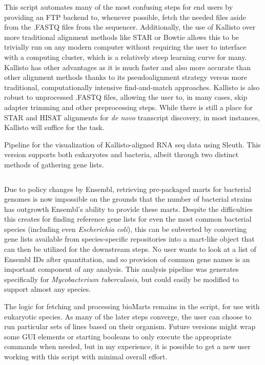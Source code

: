 This script automates many of the most confusing steps for end users by providing an FTP backend to, whenever possible, fetch the needed files aside from the .FASTQ files from the sequencer. Additionally, the use of Kallisto over more traditional alignment methods like STAR or Bowtie allows this to be trivially run on any modern computer without requiring the user to interface with a computing cluster, which is a relatively steep learning curve for many. Kallisto has other advantages as it is much faster and also more accurate than other alignment methods thanks to its pseudoalignment strategy versus more traditional, computationally intensive find-and-match approaches. Kallisto is also robust to unprocessed .FASTQ files, allowing the user to, in many cases, skip adapter trimming and other preprocessing steps. While there is still a place for STAR and HISAT alignments for \textit{de novo} transcript discovery, in most instances, Kallisto will suffice for the task. 

\begin{code}
\caption{Pipeline for the visualization of Kallisto-aligned RNA seq data using Sleuth. This version supports both eukaryotes and bacteria, albeit through two distinct methods of gathering gene lists.}
\label{blinder}

\inputminted[breaklines,frame=single,fontsize=\small]{r}{source/sleuther.R}

\end{code}

Due to policy changes by Ensembl, retrieving pre-packaged marts for bacterial genomes is now impossible on the grounds that the number of bacterial strains has outgrowth Ensembl's ability to provide these marts. Despite the difficulties this creates for finding reference gene lists for even the most common bacterial species (including even \textit{Escherichia coli}), this can be subverted by converting gene lists available from species-specific repositories into a mart-like object that can then be utilized for the downstream steps. No user wants to look at a list of Ensembl IDs after quantitation, and so provision of common gene names is an important component of any analysis. This analysis pipeline was generates specifically for \textit{Mycobacterium tuberculosis}, but could easily be modified to support almost any species.

The logic for fetching and processing bioMarts remains in the script, for use with eukaryotic species. As many of the later steps converge, the user can choose to run particular sets of lines based on their organism. Future versions might wrap some GUI elements or starting booleans to only execute the appropriate commands when needed, but in my experience, it is possible to get a new user working with this script with minimal overall effort.

